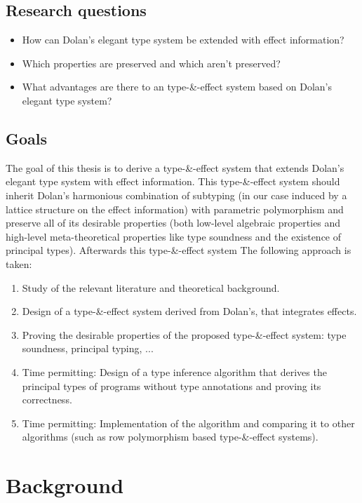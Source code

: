 \documentclass[master=cws,masteroption=ai, english]{kulemt}
\begin{document}
\section{Research questions}\label{research-questions}

\begin{itemize}
\item How can Dolan's elegant type system be extended with effect information?
\item Which properties are preserved and which aren't preserved?
\item What advantages are there to an type-\&-effect system based on Dolan's elegant type system?
\end{itemize}

\section{Goals}\label{goals}

The goal of this thesis is to derive a type-\&-effect system that
extends Dolan's elegant type system with effect information. This
type-\&-effect system should inherit Dolan's harmonious combination of
subtyping (in our case induced by a lattice structure on the effect
information) with parametric polymorphism and preserve all of its
desirable properties (both low-level algebraic properties and high-level
meta-theoretical properties like type soundness and the existence of
principal types). Afterwards this type-\&-effect system The following
approach is taken:

\begin{enumerate}
\item Study of the relevant literature and theoretical background.
\item Design of a type-\&-effect system derived from Dolan's, that integrates effects.
\item Proving the desirable properties of the proposed type-\&-effect system: type soundness, principal typing, ...
\item Time permitting: Design of a type inference algorithm that derives the principal types of programs without type annotations and proving its correctness.
\item Time permitting: Implementation of the algorithm and comparing it to other algorithms (such as row polymorphism based type-\&-effect systems).
\end{enumerate}

\chapter{Background}\label{background}
\end{document}
